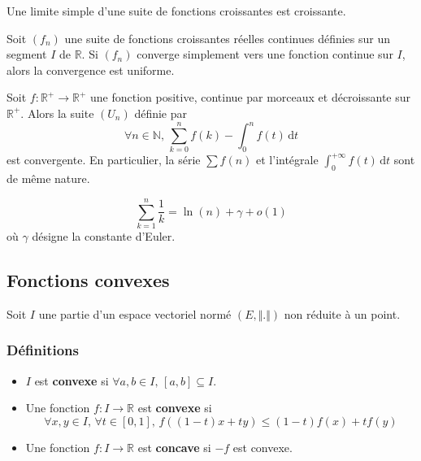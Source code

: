 
	\begin{lemma}
		Une limite simple d'une suite de fonctions croissantes est croissante.
	\end{lemma}

	\begin{theorem}
		Soit $(f_n)$ une suite de fonctions croissantes réelles continues définies sur un segment $I$ de $\mathbb{R}$. Si $(f_n)$ converge simplement vers une fonction continue sur $I$, alors la convergence est uniforme.
	\end{theorem}


	\begin{proposition}
		Soit $f : \mathbb{R}^+ \rightarrow \mathbb{R}^+$ une fonction positive, continue par morceaux et décroissante sur $\mathbb{R}^+$. Alors la suite $(U_n)$ définie par
		\[ \forall n \in \mathbb{N}, \, \sum_{k=0}^n f(k) - \int_0^n f(t) \, \mathrm{d}t \]
		est convergente. En particulier, la série $\sum f(n)$ et l'intégrale $\int_0^{+\infty} f(t) \, \mathrm{d}t$ sont de même nature.
	\end{proposition}

	\begin{application}
		\[ \sum_{k=1}^n \frac{1}{k} = \ln(n) + \gamma + o (1) \]
		où $\gamma$ désigne la constante d'Euler.
	\end{application}

	\subsection{Fonctions convexes}

	Soit $I$ une partie d'un espace vectoriel normé $(E, \Vert . \Vert)$ non réduite à un point.

	\subsubsection{Définitions}


	\begin{definition}
		\label{229-2}
		\begin{itemize}
			\item $I$ est \textbf{convexe} si $\forall a, b \in I, \, [a,b] \subseteq I$.
			\item Une fonction $f : I \rightarrow \mathbb{R}$ est \textbf{convexe} si
			\[ \forall x, y \in I, \, \forall t \in [0,1], \, f((1-t)x + ty) \leq (1-t)f(x) + tf(y) \]
			\item Une fonction $f : I \rightarrow \mathbb{R}$ est \textbf{concave} si $-f$ est convexe.
		\end{itemize}
	\end{definition}

